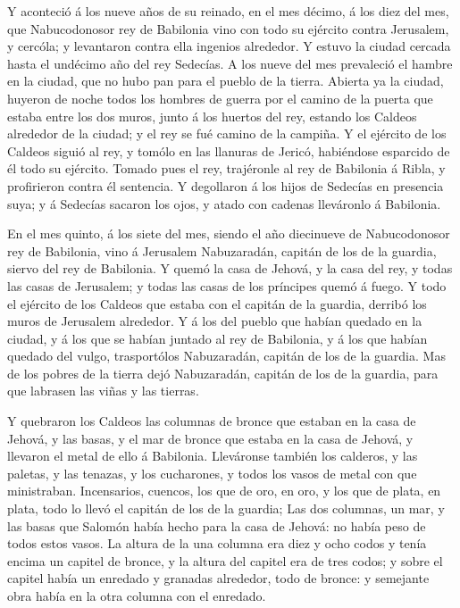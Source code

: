  Y aconteció á los nueve años de su reinado, en el mes
décimo, á los diez del mes, que Nabucodonosor rey de Babilonia vino con
todo su ejército contra Jerusalem, y cercóla; y levantaron contra ella
ingenios alrededor.  Y estuvo la ciudad cercada hasta el
undécimo año del rey Sedecías.  A los nueve del mes
prevaleció el hambre en la ciudad, que no hubo pan para el pueblo de la
tierra.  Abierta ya la ciudad, huyeron de noche todos los
hombres de guerra por el camino de la puerta que estaba entre los dos
muros, junto á los huertos del rey, estando los Caldeos alrededor de la
ciudad; y el rey se fué camino de la campiña.  Y el ejército
de los Caldeos siguió al rey, y tomólo en las llanuras de Jericó,
habiéndose esparcido de él todo su ejército.  Tomado pues el
rey, trajéronle al rey de Babilonia á Ribla, y profirieron contra él
sentencia.  Y degollaron á los hijos de Sedecías en
presencia suya; y á Sedecías sacaron los ojos, y atado con cadenas
lleváronlo á Babilonia.

 En el mes quinto, á los siete del mes, siendo el año
diecinueve de Nabucodonosor rey de Babilonia, vino á Jerusalem
Nabuzaradán, capitán de los de la guardia, siervo del rey de Babilonia.
 Y quemó la casa de Jehová, y la casa del rey, y todas las
casas de Jerusalem; y todas las casas de los príncipes quemó á fuego.
 Y todo el ejército de los Caldeos que estaba con el
capitán de la guardia, derribó los muros de Jerusalem alrededor.
 Y á los del pueblo que habían quedado en la ciudad, y á
los que se habían juntado al rey de Babilonia, y á los que habían
quedado del vulgo, trasportólos Nabuzaradán, capitán de los de la
guardia.  Mas de los pobres de la tierra dejó Nabuzaradán,
capitán de los de la guardia, para que labrasen las viñas y las tierras.

 Y quebraron los Caldeos las columnas de bronce que estaban
en la casa de Jehová, y las basas, y el mar de bronce que estaba en la
casa de Jehová, y llevaron el metal de ello á Babilonia. 
Lleváronse también los calderos, y las paletas, y las tenazas, y los
cucharones, y todos los vasos de metal con que ministraban.
 Incensarios, cuencos, los que de oro, en oro, y los que de
plata, en plata, todo lo llevó el capitán de los de la guardia;
 Las dos columnas, un mar, y las basas que Salomón había
hecho para la casa de Jehová: no había peso de todos estos vasos.
 La altura de la una columna era diez y ocho codos y tenía
encima un capitel de bronce, y la altura del capitel era de tres codos;
y sobre el capitel había un enredado y granadas alrededor, todo de
bronce: y semejante obra había en la otra columna con el enredado.

